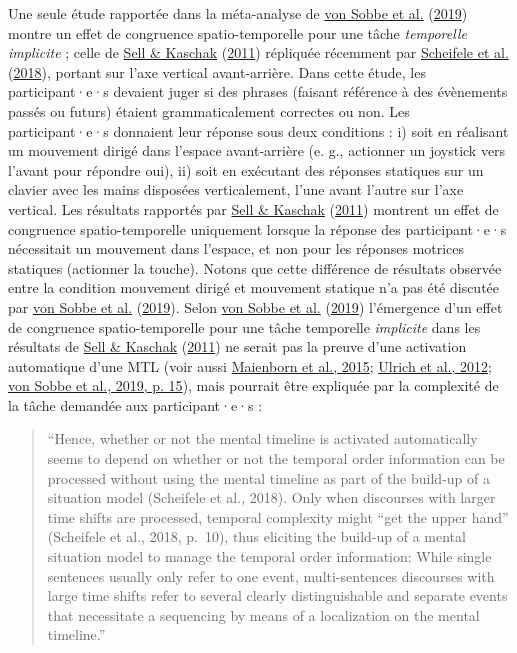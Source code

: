 \documentclass[
  a4paper,12pt,twoside,onecolumn,openright,final,oldfontcommands]{memoir}
\begin{document}
Une seule étude rapportée dans la méta-analyse de \protect\hyperlink{ref-von_sobbe_space-time_2019}{von Sobbe et al.} (\protect\hyperlink{ref-von_sobbe_space-time_2019}{2019}) montre un effet de congruence spatio-temporelle pour une tâche \emph{temporelle} \emph{implicite} ; celle de \protect\hyperlink{ref-sell_processing_2011}{Sell \& Kaschak} (\protect\hyperlink{ref-sell_processing_2011}{2011}) répliquée récemment par \protect\hyperlink{ref-scheifele_replication_2018}{Scheifele et al.} (\protect\hyperlink{ref-scheifele_replication_2018}{2018}), portant sur l'axe vertical avant-arrière. Dans cette étude, les participant·e·s devaient juger si des phrases (faisant référence à des évènements passés ou futurs) étaient grammaticalement correctes ou non. Les participant·e·s donnaient leur réponse sous deux conditions : i) soit en réalisant un mouvement dirigé dans l'espace avant-arrière (e. g., actionner un joystick vers l'avant pour répondre oui), ii) soit en exécutant des réponses statiques sur un clavier avec les mains disposées verticalement, l'une avant l'autre sur l'axe vertical. Les résultats rapportés par \protect\hyperlink{ref-sell_processing_2011}{Sell \& Kaschak} (\protect\hyperlink{ref-sell_processing_2011}{2011}) montrent un effet de congruence spatio-temporelle uniquement lorsque la réponse des participant·e·s nécessitait un mouvement dans l'espace, et non pour les réponses motrices statiques (actionner la touche). Notons que cette différence de résultats observée entre la condition mouvement dirigé et mouvement statique n'a pas été discutée par \protect\hyperlink{ref-von_sobbe_space-time_2019}{von Sobbe et al.} (\protect\hyperlink{ref-von_sobbe_space-time_2019}{2019}). Selon \protect\hyperlink{ref-von_sobbe_space-time_2019}{von Sobbe et al.} (\protect\hyperlink{ref-von_sobbe_space-time_2019}{2019}) l'émergence d'un effet de congruence spatio-temporelle pour une tâche temporelle \emph{implicite} dans les résultats de \protect\hyperlink{ref-sell_processing_2011}{Sell \& Kaschak} (\protect\hyperlink{ref-sell_processing_2011}{2011}) ne serait pas la preuve d'une activation automatique d'une MTL (voir aussi \protect\hyperlink{ref-maienborn_we_2015}{Maienborn et al., 2015}; \protect\hyperlink{ref-ulrich_past_2012}{Ulrich et al., 2012}; \protect\hyperlink{ref-von_sobbe_space-time_2019}{von Sobbe et al., 2019, p. 15}), mais pourrait être expliquée par la complexité de la tâche demandée aux participant·e·s :

\begin{quote}
``Hence, whether or not the mental timeline is activated automatically seems to depend on whether or not the temporal order information can be processed without using the mental timeline as part of the build-up of a situation model (Scheifele et al., 2018). Only when discourses with larger time shifts are processed, temporal complexity might ``get the upper hand'' (Scheifele et al., 2018, p.~10), thus eliciting the build-up of a mental situation model to manage the temporal order information: While single sentences usually only refer to one event, multi-sentences discourses with large time shifts refer to several clearly distinguishable and separate events that necessitate a sequencing by means of a localization on the mental timeline.''
\end{quote}
\end{document}
